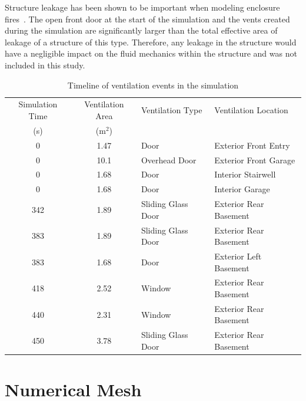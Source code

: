 \documentclass[12pt,oneside]{book}
\begin{document}
Structure leakage has been shown to be important when modeling enclosure fires~\cite{beal2009}. The open front door at the start of the simulation and the vents created during the simulation are significantly larger than the total effective area of leakage of a structure of this type. Therefore, any leakage in the structure would have a negligible impact on the fluid mechanics within the structure and was not included in this study.

\begin{table}[!ht]
\caption[Timeline of ventilation events in the simulation]
{Timeline of ventilation events in the simulation}
\begin{tabular}{ccll}
\toprule
Simulation Time      &  Ventilation Area  &  Ventilation Type    &  Ventilation Location     \\
{(s)}                &  (m$^2$)           &                      &                           \\
\midrule
0                    &  1.47              &  Door                &  Exterior Front Entry     \\
0                    &  10.1              &  Overhead Door       &  Exterior Front Garage    \\
0                    &  1.68              &  Door                &  Interior Stairwell       \\
0                    &  1.68              &  Door                &  Interior Garage          \\
342                  &  1.89              &  Sliding Glass Door  &  Exterior Rear Basement   \\
383                  &  1.89              &  Sliding Glass Door  &  Exterior Rear Basement   \\
383                  &  1.68              &  Door                &  Exterior Left Basement   \\
418                  &  2.52              &  Window              &  Exterior Rear Basement   \\
440                  &  2.31              &  Window              &  Exterior Rear Basement   \\
450                  &  3.78              &  Sliding Glass Door  &  Exterior Rear Basement   \\
\bottomrule
\end{tabular}
\label{tab:ventilation_timeline}
\end{table}

\section{Numerical Mesh}
\label{sec:numerical_mesh}
\end{document}
